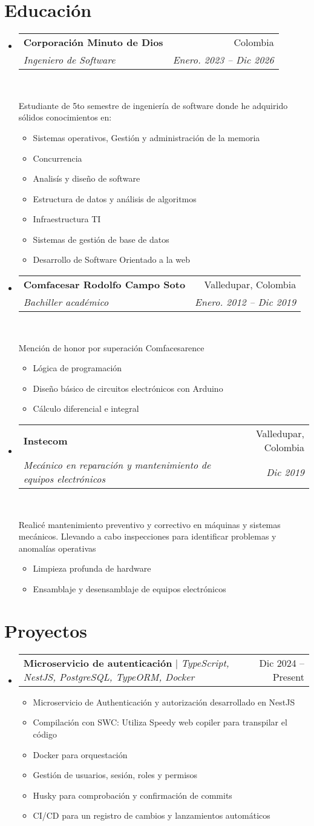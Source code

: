 \documentclass[letterpaper,11pt]{article}
\makeatletter
\newcommand{\resumeItem}[1]{
  \item\small{
    {#1 \vspace{-2pt}}
  }
}
\newcommand{\resumeSubheading}[4]{
  \vspace{-2pt}\item
    \begin{tabular*}{0.97\textwidth}[t]{l@{\extracolsep{\fill}}r}
      \textbf{#1} & #2 \\
      \textit{\small#3} & \textit{\small #4} \\
    \end{tabular*}\vspace{-7pt}
}
\newcommand{\resumeProjectHeading}[2]{
    \item
    \begin{tabular*}{0.97\textwidth}{l@{\extracolsep{\fill}}r}
      \small#1 & #2 \\
    \end{tabular*}\vspace{-7pt}
}
\newcommand{\resumeSubHeadingListStart}{\begin{itemize}[leftmargin=0.15in, label={}]}
\newcommand{\resumeSubHeadingListEnd}{\end{itemize}}
\newcommand{\resumeItemListStart}{\begin{itemize}}
\newcommand{\resumeItemListEnd}{\end{itemize}\vspace{-5pt}}
\makeatother
\begin{document}
\section{Educación}
  \resumeSubHeadingListStart

    \resumeSubheading
      {Corporación Minuto de Dios}{Colombia}
      {Ingeniero de Software}{Enero. 2023 -- Dic 2026} \
    \par{Estudiante de 5to semestre de ingeniería de software donde he adquirido sólidos conocimientos en:}
    \resumeItemListStart
        \resumeItem{Sistemas operativos, Gestión y administración de la memoria}
        \resumeItem{Concurrencia}
        \resumeItem{Analisís y diseño de software}
        \resumeItem{Estructura de datos y análisis de algoritmos}
        \resumeItem{Infraestructura TI}
        \resumeItem{Sistemas de gestión de base de datos}
        \resumeItem{Desarrollo de Software Orientado a la web}
   \resumeItemListEnd

  \resumeSubheading
  {Comfacesar Rodolfo Campo Soto}{Valledupar, Colombia}
  {Bachiller académico}{Enero. 2012 -- Dic 2019}
  \
  \par{Mención de honor por superación Comfacesarence}
  \resumeItemListStart
    \resumeItem{Lógica de programación}
    \resumeItem{Diseño básico de circuitos electrónicos con Arduino}
    \resumeItem{Cálculo diferencial e integral}
  \resumeItemListEnd

  \resumeSubheading
  {Instecom}{Valledupar, Colombia}
  {Mecánico en reparación y mantenimiento de equipos electrónicos}{Dic 2019}
  \
  \par{Realicé mantenimiento preventivo y correctivo en máquinas y sistemas mecánicos. Llevando a cabo inspecciones para identificar problemas y anomalías operativas}
  \resumeItemListStart
    \resumeItem{Limpieza profunda de hardware}
    \resumeItem{Ensamblaje y desensamblaje de equipos electrónicos}
  \resumeItemListEnd


  \resumeSubHeadingListEnd

  \section{Proyectos}
      \resumeSubHeadingListStart
        \resumeProjectHeading
            {\textbf{Microservicio de autenticación} $|$ \emph{TypeScript, NestJS, PostgreSQL, TypeORM, Docker}}{Dic 2024 -- Present}
            \resumeItemListStart
            \resumeItem{Microservicio de Authenticación y autorización desarrollado en NestJS}
            \resumeItem{Compilación con SWC: Utiliza Speedy web copiler para transpilar el código}
            \resumeItem{Docker para orquestación}
            \resumeItem{Gestión de usuarios, sesión, roles y permisos}
            \resumeItem{Husky para comprobación y confirmación de commits}
            \resumeItem{CI/CD para un registro de cambios y lanzamientos automáticos}
            \resumeItemListEnd
        \resumeSubHeadingListEnd
\end{document}
